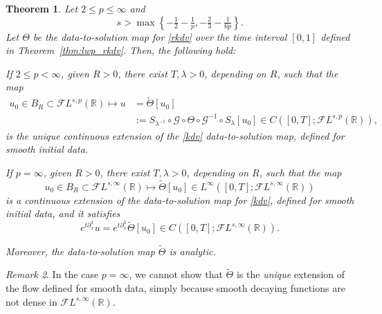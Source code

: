 \documentclass[%
11pt,  reqno]{amsart}
\newcommand{\5}{\textup{V}}
\newcommand{\noi}{\noindent}
\newcommand{\FL}{\mathcal{F} L}
\newcommand{\wt}{\widetilde}
\newcommand{\dx}{\partial_x}
\newtheorem{theorem}{Theorem} [section]
\theoremstyle{remark}
\newtheorem{remark}[theorem]{Remark}
\newcommand{\R}{\mathbb{R}}
\newcommand{\ld}{\lambda}
\newcommand{\Gc}{\mathcal{G}}
\numberwithin{equation}{section}
\numberwithin{theorem}{section}
\begin{document}
\begin{theorem}\label{thm:wp_kdv_intro} Let $2\le p\le \infty$ and
\begin{equation}
\label{eq:reg-kdv}
s>\max\left\{-\tfrac12 - \tfrac1p, -\tfrac23-\tfrac1{6p}\right\}.
\end{equation}
Let $\Theta$ be the data-to-solution map for \eqref{rkdv} over the time interval $[0,1]$ defined in Theorem~\ref{thm:lwp_rkdv}. Then, the following hold:


\vspace{1mm}

\noi{\rm(i)} If $2 \le p<\infty$, given $R>0$, there exist $T, \ld>0$, depending on $R$, such that the map
\begin{align}
u_0\in B_R\subset\FL^{s,p}(\R)\mapsto u& 
=\wt\Theta[u_0] 
\\
&:= S_{\lambda^{-1}}\circ\mathcal{G}\circ\Theta  \circ \Gc^{-1}\circ S_\lambda[u_0]\in C([0,T];\FL^{s,p}(\R)),
\end{align}
is the unique continuous extension of the \eqref{kdv} data-to-solution map, defined for smooth initial data.


\smallskip

\noi{\rm(ii)} If $p=\infty$, given $R>0$, there exist $T, \ld>0$, depending on $R$, such that the map
\begin{equation}
u_0\in B_R\subset\FL^{s,\infty}(\R)\mapsto \wt\Theta[u_0]  \in L^\infty([0,T];\FL^{s,\infty}(\R))
\end{equation}
is a continuous extension of 
the data-to-solution map for \eqref{kdv}, defined for smooth initial data, and it satisfies
\begin{equation}
e^{t\dx^3} u = e^{t\dx^3} \wt\Theta[u_0] \in C([0,T] ; \FL^{s,\infty}(\R))
.
\end{equation}

\noi 
Moreover, the data-to-solution map $\wt{\Theta}$ is analytic.
	\end{theorem}


\begin{remark}
 In the case $p=\infty$, we cannot show that $\wt{\Theta}$ is the \emph{unique} extension of the flow defined for smooth data, simply because smooth decaying functions are not dense in $\FL^{s,\infty}(\R)$.
\end{remark}
\end{document}
